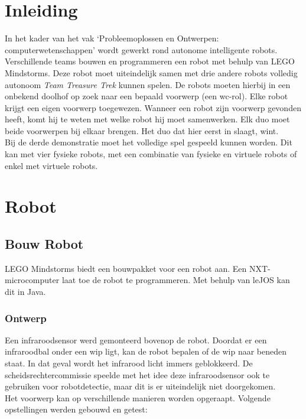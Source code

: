 \documentclass[tt3]{penoverslag}
\begin{document}
\newpage
\setcounter{tocdepth}{3}
\tableofcontents
\newpage

\section{Inleiding} %
\label{ssec:Inl}
In het kader van het vak `Probleemoplossen en Ontwerpen: computerwetenschappen' wordt gewerkt rond autonome intelligente robots. Verschillende teams bouwen en programmeren een robot met behulp van LEGO Mindstorms. Deze robot moet uiteindelijk samen met drie andere robots volledig autonoom \textit{Team Treasure Trek} kunnen spelen.
De robots moeten hierbij in een onbekend doolhof op zoek naar een bepaald voorwerp (een wc-rol). Elke robot krijgt een eigen voorwerp toegewezen. Wanneer een robot zijn voorwerp gevonden heeft, komt hij te weten met welke robot hij moet samenwerken. Elk duo moet beide voorwerpen bij elkaar brengen. Het duo dat hier eerst in slaagt, wint.\\

Bij de derde demonstratie moet het volledige spel gespeeld kunnen worden. Dit kan met vier fysieke robots, met een combinatie van fysieke en virtuele robots of enkel met virtuele robots.

\section{Robot}
\label{ssec:Robot}

\subsection{Bouw Robot}
\label{ssec:Bouw}
LEGO Mindstorms biedt een bouwpakket voor een robot aan. Een NXT-microcomputer laat toe de robot te programmeren. Met behulp van leJOS kan dit in Java.

\subsubsection{Ontwerp}
\label{ssec:FysB}
Een infraroodsensor werd gemonteerd bovenop de robot. Doordat er een infraroodbal onder een wip ligt, kan de robot bepalen of de wip naar beneden staat. In dat geval wordt het infrarood licht immers geblokkeerd. De scheidsrechtercommissie speelde met het idee deze infraroodsensor ook te gebruiken voor robotdetectie, maar dit is er uiteindelijk niet doorgekomen.\\

Het voorwerp kan op verschillende manieren worden opgeraapt. Volgende opstellingen werden gebouwd en getest:
\end{document}
